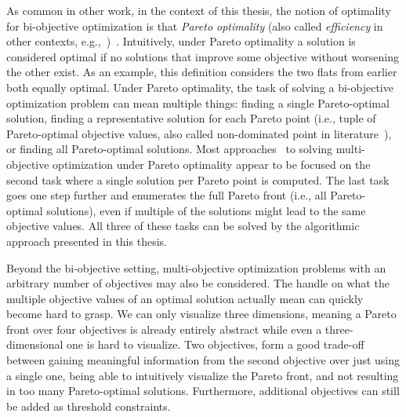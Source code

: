 As common in other work, in the context of this thesis, the notion of optimality for bi-objective optimization is that \emph{Pareto optimality} (also called \emph{efficiency} in other contexts, e.g.,~\autocite{DBLP:journals/siamjo/SantisENR20})~\autocite{Ehrgott2005-2}.
Intuitively, under Pareto optimality a solution is considered optimal if no solutions that improve some objective without worsening the other exist.
As an example, this definition considers the two flats from earlier both equally optimal.
Under Pareto optimality, the task of solving a bi-objective optimization problem can mean multiple things:
finding a single Pareto-optimal solution, finding a representative solution for each Pareto point (i.e., tuple of Pareto-optimal objective values, also called non-dominated point in literature~\autocite{Ehrgott2005-2}), or finding all Pareto-optimal solutions.
Most approaches~\autocite{DBLP:conf/cp/SohBTB17,DBLP:conf/cp/JanotaMSM21,DBLP:conf/ijcai/Terra-NevesLM18a} to solving multi-objective optimization under Pareto optimality appear to be focused on the second task where a single solution per Pareto point is computed.
The last task goes one step further and enumerates the full Pareto front (i.e., all Pareto-optimal solutions), even if multiple of the solutions might lead to the same objective values.
All three of these tasks can be solved by the algorithmic approach presented in this thesis.

Beyond the bi-objective setting, multi-objective optimization problems with an arbitrary number of objectives may also be considered.
The handle on what the multiple objective values of an optimal solution actually mean can quickly become hard to grasp.
We can only visualize three dimensions, meaning a Pareto front over four objectives is already entirely abstract while even a three-dimensional one is hard to visualize.
Two objectives, form a good trade-off between gaining meaningful information from the second objective over just using a single one, being able to intuitively visualize the Pareto front, and not resulting in too many Pareto-optimal solutions.
Furthermore, additional objectives can still be added as threshold constraints.

